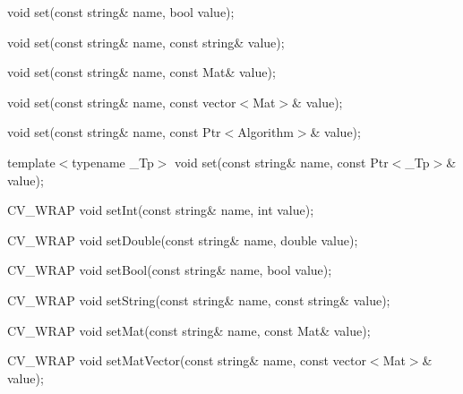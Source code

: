 {\ttfamily }

{\ttfamily void set(const string\& name, bool value);}

{\ttfamily }

{\ttfamily }

{\ttfamily void set(const string\& name, const string\& value);}

{\ttfamily }

{\ttfamily }

{\ttfamily void set(const string\& name, const Mat\& value);}

{\ttfamily }

{\ttfamily }

{\ttfamily void set(const string\& name, const vector$<$\+Mat$>$\& value);}

{\ttfamily }

{\ttfamily }

{\ttfamily void set(const string\& name, const Ptr$<$\+Algorithm$>$\& value);}

{\ttfamily }

{\ttfamily }

{\ttfamily template$<$typename \+\_\+\+Tp$>$ void set(const string\& name, const Ptr$<$\+\_\+\+Tp$>$\& value);}

{\ttfamily }

{\ttfamily }

{\ttfamily C\+V\+\_\+\+W\+R\+AP void set\+Int(const string\& name, int value);}

{\ttfamily }

{\ttfamily }

{\ttfamily C\+V\+\_\+\+W\+R\+AP void set\+Double(const string\& name, double value);}

{\ttfamily }

{\ttfamily }

{\ttfamily C\+V\+\_\+\+W\+R\+AP void set\+Bool(const string\& name, bool value);}

{\ttfamily }

{\ttfamily }

{\ttfamily C\+V\+\_\+\+W\+R\+AP void set\+String(const string\& name, const string\& value);}

{\ttfamily }

{\ttfamily }

{\ttfamily C\+V\+\_\+\+W\+R\+AP void set\+Mat(const string\& name, const Mat\& value);}

{\ttfamily }

{\ttfamily }

{\ttfamily C\+V\+\_\+\+W\+R\+AP void set\+Mat\+Vector(const string\& name, const vector$<$\+Mat$>$\& value);}

